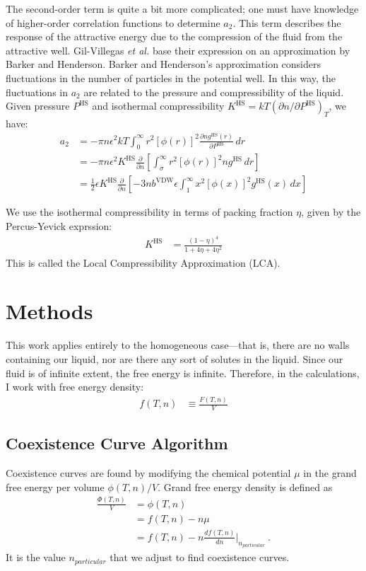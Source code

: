 \documentclass[letterpaper,twocolumn,amsmath,amssymb,prb]{revtex4-1}
\newcommand{\npart}{\ensuremath{n_{particular}}}
\newcommand{\1}{\ensuremath{\textbf{r}_1}}
\newcommand{\2}{\ensuremath{\textbf{r}_2}}
\newcommand{\3}{\ensuremath{\textbf{r}_3}}
\newcommand{\4}{\ensuremath{\textbf{r}_4}}
\begin{document}
The second-order term is quite a bit more complicated; one must have
knowledge of higher-order correlation functions to determine
$a_2$. This term describes the response of the attractive energy due
to the compression of the fluid from the attractive well. Gil-Villegas
\emph{et al.} base their expression on an approximation by Barker and
Henderson.\cite{Barker67} Barker and Henderson's approximation
considers fluctuations in the number of particles in the potential
well. In this way, the fluctuations in $a_2$ are related to the
pressure and compressibility of the liquid. Given pressure
$P^\text{HS}$ and isothermal compressibility $K^\text{HS} =
kT\left(\partial n /\partial P^\text{HS}\right)_T$, we have:
\begin{align}
  a_2 &= -\pi n \epsilon^2kT\int_0^\infty r^2\left[\phi(r)\right]^2\frac{\partial n  g^\text{HS}(r)}{\partial P^\text{HS}}\,dr \\
  &= -\pi n \epsilon^2K^\text{HS}\frac{\partial}{\partial n }\left[\int_\sigma^\infty r^2\left[\phi(r)\right]^2 n  g^\text{HS}\,dr\right] \\
  &= \frac{1}{2}\epsilon K^\text{HS}\frac{\partial}{\partial n }\left[-3 n  b^\text{VDW}\epsilon\int_1^\infty x^2\left[\phi(x)\right]^2 g^\text{HS}(x)\,dx \right]
\end{align}

We use the isothermal compressibility in terms of packing fraction
$\eta$, given by the Percus-Yevick exprssion:\cite{Barker76}
\begin{align}
  K^\text{HS} &= \frac{\left(1 - \eta\right)^4}{1 + 4\eta + 4\eta^2}
\end{align}
This is called the Local Compressibility Approximation (LCA).
\section{Methods}\label{sec:methods}

This work applies entirely to the homogeneous case---that is, there
are no walls containing our liquid, nor are there any sort of solutes
in the liquid. Since our fluid is of infinite extent, the free energy
is infinite. Therefore, in the calculations, I work with free energy density:
\begin{align}
  f(T,n) &\equiv \frac{F(T,n)}{V}
\end{align}

\subsection{Coexistence Curve Algorithm}\label{subsec:coexis}
Coexistence curves are found by modifying the chemical potential $\mu$
in the grand free energy per volume $\phi(T,n)/V$. Grand free energy
density is defined as
\begin{align}
  \frac{\Phi(T,n)}{V} &= \phi(T,n) \nonumber \\
                 &= f(T,n) - n\mu \nonumber \\
                 &= f(T,n) - n\frac{df(T,n)}{dn}\bigg|_{\npart}\ .
\end{align}
It is the value $\npart$ that we adjust to find coexistence curves.
\end{document}
